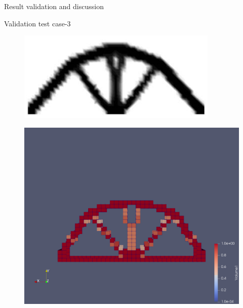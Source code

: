 \documentclass[a4paper,12pt,times]{article}
\begin{document}
\begin{section}{Result validation and discussion}
\begin{subsection}{Validation test case-3}
\begin{figure}[H]
	\centering
	\begin{minipage}{.5\textwidth}
		\centering
		\includegraphics[width=1\linewidth]{analytical_3.png}
		\label{VC-05.1}
	\end{minipage}%
	\begin{minipage}{.5\textwidth}
		\centering
		\includegraphics[width=1\linewidth]{Numerical_result_MMA_03.png}
		\label{VC-05.2}
	\end{minipage}
\end{figure} 
\begin{figure}[H]
	\centering
	\begin{minipage}{.5\textwidth}

\end{minipage}
\end{figure}
\end{subsection}
\end{section}
\end{document}
